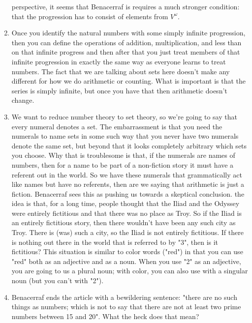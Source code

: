 \documentclass[12pt]{article}
\theoremstyle{definition}
\begin{document}
\begin{enumerate}
        perspective, it seems that Benacerraf is requires a much stronger
        condition: that the progression has to consist of elements from
        $V^\omega$. 
    \item
        Once you identify the natural numbers with some simply infinite
        progression, then you can define the operations of addition,
        multiplication, and less than on that infinite progress and then after
        that you just treat members of that infinite progression in exactly the
        same way as everyone learns to treat numbers. The fact that we are
        talking about sets here doesn't make any different for how we do
        arithmetic or counting. What is important is that the series is simply
        infinite, but once you have that then arithmetic doesn't change.
    \item
        We want to reduce number theory to set theory, so we're going to say
        that every numeral denotes a set. The embarrassment is that you need
        the numerals to name sets in some such way that you never have two numerals
        denote the same set, but beyond that it looks completely arbitrary
        which sets you choose. Why that is troublesome is that, if the numerals
        are names of numbers, then for a name to be part of a non-fiction story
        it must have a referent out in the world. So we have these numerals
        that grammatically act like names but have no referents, then are we
        saying that arithmetic is just a fiction. Benacerraf sees this as
        pushing us towards a skeptical conclusion. the idea is that, for a long
        time, people thought that the Iliad and the Odyssey were entirely
        fictitious and that there was no place as Troy. So if the Iliad is an
        entirely fictitious story, then there wouldn't have been any such city
        as Troy. There is (was) such a city, so the Iliad is not entirely
        fictitious. If there is nothing out there in the world that is referred
        to by "3", then is it fictitious? This situation is similar to color
        words ("red") in that you can use "red" both as an adjective and as a
        noun. When you use "2" as an adjective, you are going to us a plural
        noun; with color, you can also use with a singular noun (but you can't
        with "2").
    \item
        Benacerraf ends the article with a bewildering sentence: "there are no
        such things as numbers; which is not to say that there are not at least
        two prime numbers between 15 and 20". What the heck does that mean?

\end{enumerate}
\end{document}
